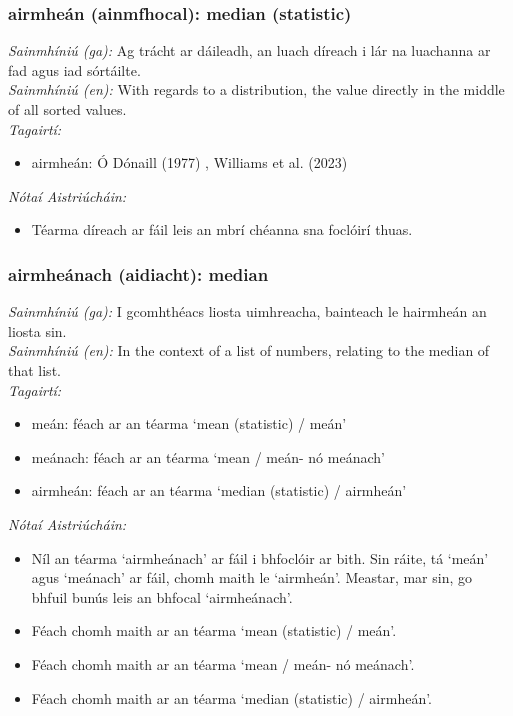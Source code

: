 \subsubsection*{airmheán (ainmfhocal): median (statistic)}
 \noindent \textit{Sainmhíniú (ga):} Ag trácht ar dáileadh, an luach díreach i lár na luachanna ar fad agus iad sórtáilte.
\\
 \noindent \textit{Sainmhíniú (en):} With regards to a distribution, the value directly in the middle of all sorted values.
\\
 \noindent \textit{Tagairtí:}
\begin{itemize}
	\item airmheán: Ó Dónaill (1977) \cite{odonaill}, Williams et al. (2023) \cite{storchiste}
\end{itemize}

 \noindent \textit{Nótaí Aistriúcháin:}
\begin{itemize}
	\item Téarma díreach ar fáil leis an mbrí chéanna sna foclóirí thuas.
\end{itemize}


\subsubsection*{airmheánach (aidiacht): median}
 \noindent \textit{Sainmhíniú (ga):} I gcomhthéacs liosta uimhreacha, bainteach le hairmheán an liosta sin.
\\
 \noindent \textit{Sainmhíniú (en):} In the context of a list of numbers, relating to the median of that list.
\\
 \noindent \textit{Tagairtí:}
\begin{itemize}
	\item meán: féach ar an téarma `mean (statistic) / meán'
	\item meánach: féach ar an téarma `mean / meán- nó meánach'
	\item airmheán: féach ar an téarma `median (statistic) / airmheán'
\end{itemize}

 \noindent \textit{Nótaí Aistriúcháin:}
\begin{itemize}
	\item Níl an téarma `airmheánach' ar fáil i bhfoclóir ar bith. Sin ráite, tá `meán' agus `meánach' ar fáil, chomh maith le `airmheán'. Meastar, mar sin, go bhfuil bunús leis an bhfocal `airmheánach'.
	\item Féach chomh maith ar an téarma `mean (statistic) / meán'.
	\item Féach chomh maith ar an téarma `mean / meán- nó meánach'.
	\item Féach chomh maith ar an téarma `median (statistic) / airmheán'.
\end{itemize}


